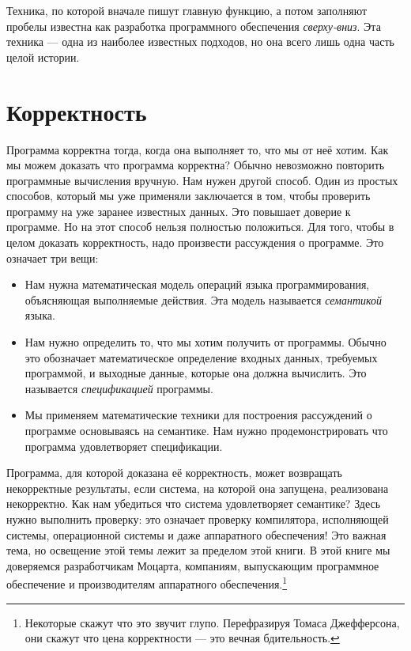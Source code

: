 Техника, по которой вначале пишут главную функцию, а потом заполняют пробелы известна как разработка программного обеспечения \emph{сверху-вниз}. Эта техника --- одна из наиболее известных подходов, но она всего лишь одна часть целой истории.

\section{Корректность}\label{section:Correctness}

Программа корректна тогда, когда она выполняет то, что мы от неё хотим. Как мы можем доказать что программа корректна? Обычно невозможно повторить программные вычисления вручную. Нам нужен другой способ. Один из простых способов, который мы уже применяли заключается в том, чтобы проверить программу на уже заранее известных данных. Это повышает доверие к программе. Но на этот способ нельзя полностью положиться. Для того, чтобы в целом доказать корректность, надо произвести рассуждения о программе. Это означает три вещи:

\begin{itemize}
\item{Нам нужна математическая модель операций языка программирования, объясняющая выполняемые действия. Эта модель называется \emph{семантикой} языка.}

\item{Нам нужно определить то, что мы хотим получить от программы. Обычно это обозначает математическое определение входных данных, требуемых программой, и выходные данные, которые она должна вычислить. Это называется \emph{спецификацией} программы.}

\item{Мы применяем математические техники для построения рассуждений о программе основываясь на семантике. Нам нужно продемонстрировать что программа удовлетворяет спецификации.}
\end{itemize}

Программа, для которой доказана её корректность, может возвращать некорректные результаты, если система, на которой она запущена, реализована некорректно. Как нам убедиться что система удовлетворяет семантике? Здесь нужно выполнить проверку: это означает проверку компилятора, исполняющей системы, операционной системы и даже аппаратного обеспечения! Это важная тема, но освещение этой темы лежит за пределом этой книги. В этой книге мы доверяемся разработчикам Моцарта, компаниям, выпускающим программное обеспечение и производителям аппаратного обеспечения.\footnote{Некоторые скажут что это звучит глупо. Перефразируя Томаса Джефферсона, они скажут что цена корректности --- это вечная бдительность.}



